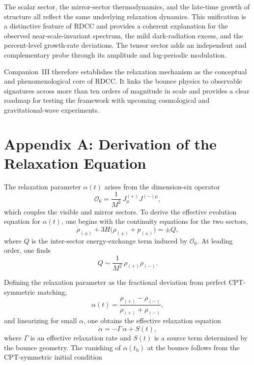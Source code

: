 \documentclass[11pt,a4paper]{article}
\begin{document}
The scalar sector, the mirror-sector thermodynamics, and the late-time growth of
structure all reflect the same underlying relaxation dynamics. This unification is a
distinctive feature of RDCC and provides a coherent explanation for the observed
near-scale-invariant spectrum, the mild dark-radiation excess, and the percent-level
growth-rate deviations. The tensor sector adds an independent and complementary
probe through its amplitude and log-periodic modulation.

Companion~III therefore establishes the relaxation mechanism as the conceptual and
phenomenological core of RDCC. It links the bounce physics to observable signatures
across more than ten orders of magnitude in scale and provides a clear roadmap for
testing the framework with upcoming cosmological and gravitational-wave experiments.

\appendix

\section*{Appendix A: Derivation of the Relaxation Equation}

The relaxation parameter $\alpha(t)$ arises from the dimension-six operator
\begin{equation}
    \mathcal{O}_{6}
    = \frac{1}{M^{2}}\, J^{(+)}_{\mu} J^{(-)\mu},
\end{equation}
which couples the visible and mirror sectors. To derive the effective evolution
equation for $\alpha(t)$, one begins with the continuity equations for the two sectors,
\begin{equation}
    \dot{\rho}_{(\pm)} + 3H\bigl(\rho_{(\pm)} + p_{(\pm)}\bigr)
    = \pm Q,
\end{equation}
where $Q$ is the inter-sector energy-exchange term induced by $\mathcal{O}_{6}$.
At leading order, one finds
\begin{equation}
    Q \sim \frac{1}{M^{2}}\, \rho_{(+)} \rho_{(-)}.
\end{equation}

Defining the relaxation parameter as the fractional deviation from perfect
CPT-symmetric matching,
\begin{equation}
    \alpha(t)
    = \frac{\rho_{(+)} - \rho_{(-)}}{\rho_{(+)} + \rho_{(-)}},
\end{equation}
and linearizing for small $\alpha$, one obtains the effective relaxation equation
\begin{equation}
    \dot{\alpha}
    = -\Gamma\,\alpha + S(t),
\end{equation}
where $\Gamma$ is an effective relaxation rate and $S(t)$ is a source term determined
by the bounce geometry. The vanishing of $\alpha(t_{\mathrm{b}})$ at the bounce follows
from the CPT-symmetric initial condition
\end{document}

